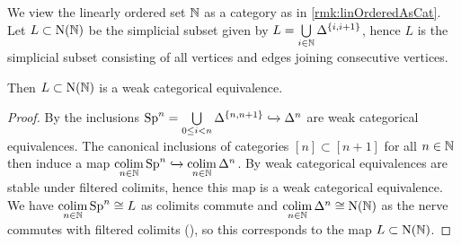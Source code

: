 \begin{lemma}\label{lem:spineInclIsWCE}
    We view the linearly ordered set $\mathbb{N}$ as a category as in \cref{rmk:linOrderedAsCat}.
    Let $L\subset\operatorname{N}(\mathbb{N})$ be the simplicial subset given by $L=\bigcup\limits_{i\in\mathbb{N}}\Delta^{\left\lbrace i,i+1\right\rbrace}$, hence $L$ is the simplicial subset consisting of all vertices and edges joining consecutive vertices.
    
    Then $L\subset\operatorname{N}(\mathbb{N})$ is a weak categorical equivalence.
    \begin{proof}
        By \cite[Proposition 3.7.4]{cisinski_2019} the inclusions $\operatorname{Sp}^n=\bigcup\limits_{0\leq i<n}\Delta^{\left\lbrace n,n+1\right\rbrace}\xhookrightarrow{}\Delta^n$ are weak categorical equivalences.
        The canonical inclusions of categories $[n]\subset[n+1]$ for all $n\in\mathbb{N}$ then induce a map $\operatorname*{colim}\limits_{n\in\mathbb{N}}\operatorname{Sp}^n\xhookrightarrow{}\operatorname*{colim}\limits_{n\in\mathbb{N}}\Delta^n$.
        By \cite[Corollary 3.9.8]{cisinski_2019} weak categorical equivalences are stable under filtered colimits, hence this map is a weak categorical equivalence.
        We have $\operatorname*{colim}\limits_{n\in\mathbb{N}}\operatorname{Sp}^n\cong L$ as colimits commute and $\operatorname*{colim}\limits_{n\in\mathbb{N}}\Delta^n\cong\operatorname{N}(\mathbb{N})$ as the nerve commutes with filtered colimits (\cite[Corollary 1.3.12]{cisinski_2019}), so this corresponds to the map $L\subset\operatorname{N}(\mathbb{N})$.
    \end{proof}
\end{lemma}

